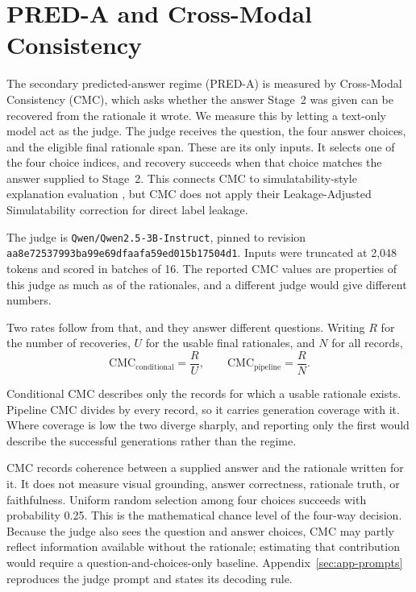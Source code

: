 \section{PRED-A and Cross-Modal Consistency}
\label{sec:framework-pred-a}

The secondary predicted-answer regime (PRED-A) is measured by Cross-Modal
Consistency (CMC), which asks whether the answer Stage~2 was given can be
recovered from the rationale it wrote. We measure this by letting a text-only
model act as the judge. The judge receives the question, the four answer
choices, and the eligible final rationale span. These are its only inputs. It
selects one of the four choice indices, and recovery succeeds when that choice
matches the answer supplied to Stage~2. This connects CMC to simulatability-style
explanation evaluation \citep{DBLP:conf/emnlp/HaseZXB20}, but CMC does not apply
their Leakage-Adjusted Simulatability correction for direct label leakage.

The judge is \texttt{Qwen/Qwen2.5-3B-Instruct}, pinned to revision
\texttt{aa8e72537993ba99e69dfaafa59ed015b17504d1}. Inputs were truncated at 2,048
tokens and
scored in batches of 16. The reported CMC values are properties of this judge as
much as of the rationales, and a different judge would give different numbers.

\begin{samepage}
Two rates follow from that, and they answer different questions. Writing $R$ for
the number of recoveries, $U$ for the usable final rationales, and $N$ for all
records,
\[
  \mathrm{CMC}_{\mathrm{conditional}} = \frac{R}{U},
  \qquad
  \mathrm{CMC}_{\mathrm{pipeline}} = \frac{R}{N}.
\]
\end{samepage}
Conditional CMC describes only the records for which a usable rationale exists.
Pipeline CMC divides by every record, so it carries generation coverage with it.
Where coverage is low the two diverge sharply, and reporting only the first
would describe the successful generations rather than the regime.

CMC records coherence between a supplied answer and the rationale written for it.
It does not measure visual grounding, answer correctness, rationale truth, or
faithfulness. Uniform random selection among four choices succeeds with
probability 0.25. This is the mathematical chance level of the four-way
decision. Because the judge also sees the question and answer choices, CMC may partly
reflect information available without the rationale; estimating that
contribution would require a question-and-choices-only baseline.
Appendix~\ref{sec:app-prompts} reproduces the judge prompt and states its
decoding rule.
